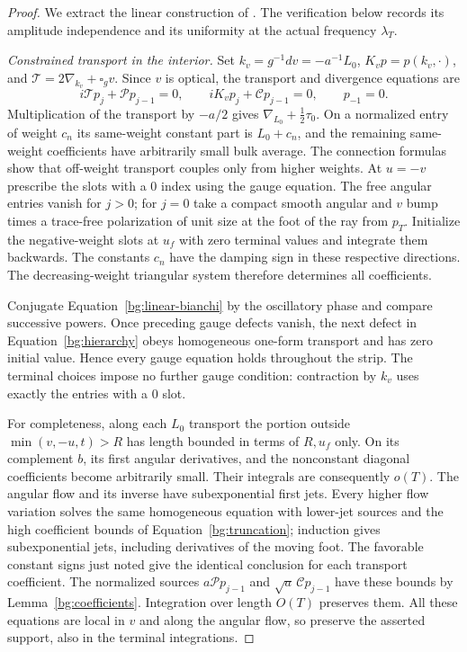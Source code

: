 \begin{proof}
We extract the linear construction of
\cite[, and the proof of ]{Foundation}.
The verification below records its amplitude independence and its
uniformity at the actual frequency $\lambda_T$.

\emph{Constrained transport in the interior.}
Set $k_v=g^{-1}dv=-a^{-1}L_0$, $K_vp=p(k_v,\cdot)$, and
$\mathcal T=2\nabla_{k_v}+\square_gv$.  Since $v$ is optical,
the transport and divergence equations are
\begin{equation}\label{bg:hierarchy}
 i\mathcal Tp_j+\mathcal Pp_{j-1}=0,
 \qquad iK_vp_j+\mathcal Cp_{j-1}=0,
 \qquad p_{-1}=0.
\end{equation}
Multiplication of the transport by $-a/2$ gives
$\nabla_{L_0}+\tfrac12\tau_0$.  On a normalized entry of weight
$c_n$ its same-weight constant part is $L_0+c_n$, and the
remaining same-weight coefficients have arbitrarily small bulk
average.  The connection formulas show that off-weight transport
couples only from higher weights.  At $u=-v$ prescribe the slots
with a $0$ index using the gauge equation.  The free angular
entries vanish for $j>0$; for $j=0$ take a compact smooth angular
and $v$ bump times a trace-free polarization of unit size at the
foot of the ray from $p_T$.  Initialize the negative-weight slots
at $u_f$ with zero terminal values and integrate them backwards.
The constants $c_n$ have the damping sign in these respective
directions.  The decreasing-weight triangular system therefore
determines all coefficients.

Conjugate Equation~\eqref{bg:linear-bianchi} by the oscillatory
phase and compare successive powers.  Once preceding gauge
defects vanish, the next defect in Equation~\eqref{bg:hierarchy}
obeys homogeneous one-form transport and has zero initial value.
Hence every gauge equation holds throughout the strip.  The
terminal choices impose no further gauge condition: contraction
by $k_v$ uses exactly the entries with a $0$ slot.

For completeness, along each $L_0$ transport the portion outside
$\min(v,-u,t)>R$ has length bounded in terms of $R,u_f$ only.
On its complement $b$, its first angular derivatives, and the
nonconstant diagonal coefficients become arbitrarily small.
Their integrals are consequently $o(T)$.  The angular flow and
its inverse have subexponential first jets.  Every higher flow
variation solves the same homogeneous equation with lower-jet
sources and the high coefficient bounds of
Equation~\eqref{bg:truncation}; induction gives subexponential
jets, including derivatives of the moving foot.  The favorable
constant signs just noted give the identical conclusion for
each transport coefficient.  The normalized sources
$a\mathcal Pp_{j-1}$ and $\sqrt a\,\mathcal Cp_{j-1}$ have
these bounds by Lemma~\ref{bg:coefficients}.  Integration over
length $O(T)$ preserves them.  All these equations are local in
$v$ and along the angular flow, so preserve the asserted support,
also in the terminal integrations.


\end{proof}
